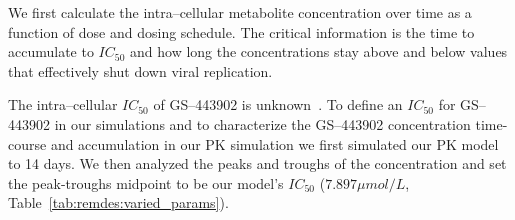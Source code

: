 We first calculate the intra--cellular metabolite concentration over time as a function of dose and dosing schedule. The critical information is the time to accumulate to $IC_{50}$ and how long the concentrations stay above and below values that effectively shut down viral replication.

The intra--cellular $IC_{50}$ of GS--443902 is unknown~\cite{sun2020remdesivir,hanafin_mechanismbased_2021}. To define an $IC_{50}$ for GS--443902 in our simulations and to characterize the GS--443902 concentration time-course and accumulation in our PK simulation we first simulated our PK model to 14 days. We then analyzed the peaks and troughs of the concentration and set the peak-troughs midpoint to be our model's $IC_{50}$ ($7.897\mu mol/L$, Table~\ref{tab:remdes:varied_params}).





